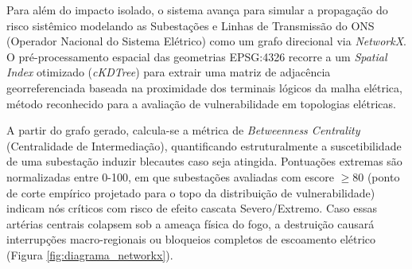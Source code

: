 Para além do impacto isolado, o sistema avança para simular a propagação do risco sistêmico modelando as Subestações e Linhas de Transmissão do ONS (Operador Nacional do Sistema Elétrico) como um grafo direcional via \textit{NetworkX}. O pré-processamento espacial das geometrias EPSG:4326 recorre a um \textit{Spatial Index} otimizado (\textit{cKDTree}) para extrair uma matriz de adjacência georreferenciada baseada na proximidade dos terminais lógicos da malha elétrica, método reconhecido para a avaliação de vulnerabilidade em topologias elétricas.

A partir do grafo gerado, calcula-se a métrica de \textit{Betweenness Centrality} (Centralidade de Intermediação), quantificando estruturalmente a suscetibilidade de uma subestação induzir blecautes caso seja atingida. Pontuações extremas são normalizadas entre 0-100, em que subestações avaliadas com escore $\geq 80$ (ponto de corte empírico projetado para o topo da distribuição de vulnerabilidade) indicam nós críticos com risco de efeito cascata Severo/Extremo. Caso essas artérias centrais colapsem sob a ameaça física do fogo, a destruição causará interrupções macro-regionais ou bloqueios completos de escoamento elétrico (Figura \ref{fig:diagrama_networkx}).


